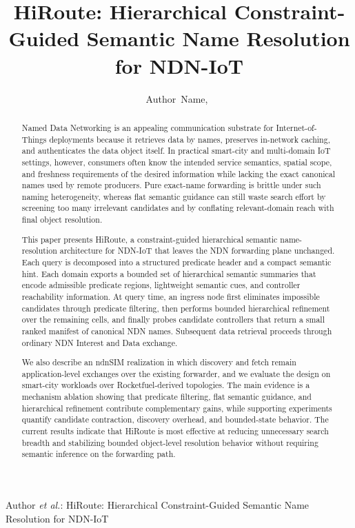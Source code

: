 \documentclass[journal]{IEEEtran}
\newcommand{\sysname}{HiRoute}
\begin{document}
\title{HiRoute: Hierarchical Constraint-Guided Semantic Name Resolution for NDN-IoT}

\author{Author~Name,~}

%
{Author \MakeLowercase{\textit{et al.}}: HiRoute: Hierarchical Constraint-Guided Semantic Name Resolution for NDN-IoT}

\maketitle

\begin{abstract}
Named Data Networking is an appealing communication substrate for Internet-of-Things deployments because it retrieves data by names, preserves in-network caching, and authenticates the data object itself. In practical smart-city and multi-domain IoT settings, however, consumers often know the intended service semantics, spatial scope, and freshness requirements of the desired information while lacking the exact canonical names used by remote producers. Pure exact-name forwarding is brittle under such naming heterogeneity, whereas flat semantic guidance can still waste search effort by screening too many irrelevant candidates and by conflating relevant-domain reach with final object resolution.

This paper presents \sysname{}, a constraint-guided hierarchical semantic name-resolution architecture for NDN-IoT that leaves the NDN forwarding plane unchanged. Each query is decomposed into a structured predicate header and a compact semantic hint. Each domain exports a bounded set of hierarchical semantic summaries that encode admissible predicate regions, lightweight semantic cues, and controller reachability information. At query time, an ingress node first eliminates impossible candidates through predicate filtering, then performs bounded hierarchical refinement over the remaining cells, and finally probes candidate controllers that return a small ranked manifest of canonical NDN names. Subsequent data retrieval proceeds through ordinary NDN Interest and Data exchange.

We also describe an ndnSIM realization in which discovery and fetch remain application-level exchanges over the existing forwarder, and we evaluate the design on smart-city workloads over Rocketfuel-derived topologies. The main evidence is a mechanism ablation showing that predicate filtering, flat semantic guidance, and hierarchical refinement contribute complementary gains, while supporting experiments quantify candidate contraction, discovery overhead, and bounded-state behavior. The current results indicate that \sysname{} is most effective at reducing unnecessary search breadth and stabilizing bounded object-level resolution behavior without requiring semantic inference on the forwarding path.
\end{abstract}
\end{document}
